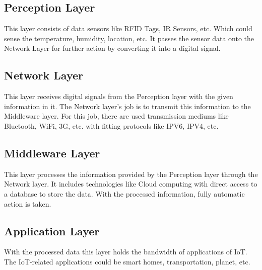 \documentclass[twoside,twocolumn]{article}
\begin{document}
    \subsection{Perception Layer}
        \noindent This layer consists of data sensors like RFID Tags, IR Sensors, etc. Which could sense the temperature, humidity, location, etc. It passes the sensor data onto the Network Layer for further action by converting it into a digital signal.
    \subsection{Network Layer}
        \noindent This layer receives digital signals from the Perception layer with the given information in it. The Network layer's job is to transmit this information to the Middleware layer. For this job, there are used transmission mediums like Bluetooth, WiFi, 3G, etc. with fitting protocols like IPV6, IPV4, etc.
    \subsection{Middleware Layer}
        \noindent This layer processes the information provided by the Perception layer through the Network layer. It includes technologies like Cloud computing with direct access to a database to store the data. With the processed information, fully automatic action is taken.
    \subsection{Application Layer}
        \noindent With the processed data this layer holds the bandwidth of applications of IoT. The IoT-related applications could be smart homes, transportation, planet, etc.
\end{document}
